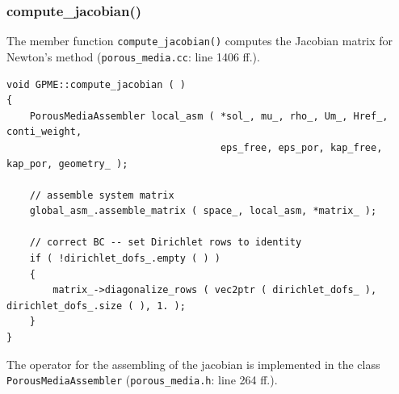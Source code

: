 \documentclass{article}
\begin{document}
\subsubsection{compute\_jacobian()}
\label{sec:matrix}

The member function \texttt{compute\_jacobian()} computes the Jacobian matrix for Newton's method (\texttt{porous\_media.cc}: line 1406 ff.).

\begin{lstlisting}[firstnumber=1406]
void GPME::compute_jacobian ( )
{
    PorousMediaAssembler local_asm ( *sol_, mu_, rho_, Um_, Href_, conti_weight,
                                     eps_free, eps_por, kap_free, kap_por, geometry_ );

    // assemble system matrix
    global_asm_.assemble_matrix ( space_, local_asm, *matrix_ );

    // correct BC -- set Dirichlet rows to identity
    if ( !dirichlet_dofs_.empty ( ) )
    {
        matrix_->diagonalize_rows ( vec2ptr ( dirichlet_dofs_ ), dirichlet_dofs_.size ( ), 1. );
    }
}
\end{lstlisting}

The operator for the assembling of the jacobian  is implemented in the class \texttt{PorousMediaAssembler} (\texttt{porous\_media.h}: line 264 ff.).
\end{document}

